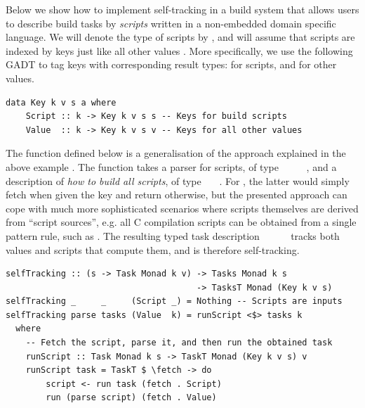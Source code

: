 Below we show how to implement self-tracking in a build system that allows users
to describe build tasks by \emph{scripts} written in a non-embedded domain
specific language. We will denote the type of scripts by , and will assume
that scripts are indexed by keys  just like all other values . More
specifically, we use the following GADT to tag keys  with corresponding
result types:  for scripts, and  for other values.

\vspace{1mm}
\begin{verbatim}
data Key k v s a where
    Script :: k -> Key k v s s -- Keys for build scripts
    Value  :: k -> Key k v s v -- Keys for all other values
\end{verbatim}
\vspace{1mm}

\noindent
The function  defined below is a generalisation of the approach
explained in the above \Excel example . The function takes a parser
for scripts, of type ~\hs{->}~~~~, and a
description of \emph{how to build all scripts}, of type
~~~. For , the latter would simply
fetch  when given the key  and return 
otherwise, but the presented approach can cope with much more sophisticated
scenarios where scripts themselves are derived from ``script sources'', e.g. all
C compilation scripts can be obtained from a single pattern rule, such as
. The resulting typed task description
~~~~~ tracks both values and
scripts that compute them, and is therefore self-tracking.

\vspace{1mm}
\begin{verbatim}
selfTracking :: (s -> Task Monad k v) -> Tasks Monad k s
                                      -> TasksT Monad (Key k v s)
selfTracking _     _     (Script _) = Nothing -- Scripts are inputs
selfTracking parse tasks (Value  k) = runScript <$> tasks k
  where
    -- Fetch the script, parse it, and then run the obtained task
    runScript :: Task Monad k s -> TaskT Monad (Key k v s) v
    runScript task = TaskT $ \fetch -> do
        script <- run task (fetch . Script)
        run (parse script) (fetch . Value)
\end{verbatim}
\vspace{1mm}

